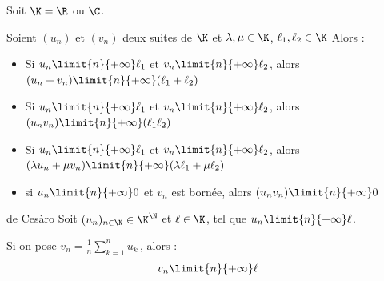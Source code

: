 \begin{theoreme}{}{}
    Soit $\K = \R$ ou $\C$. 

    Soient $(u_n)$ et $(v_n)$ deux suites de $\K$ et $\lambda, \mu \in \K$, $\ell_1, \ell_2 \in \K$ Alors : 

    \begin{itemize}
        \item Si $u_n \limit{n}{+\infty} \ell_1$ et $v_n \limit{n}{+\infty} \ell_2$, alors $(u_n + v_n) \limit{n}{+\infty} (\ell_1 + \ell_2)$
        \item Si $u_n \limit{n}{+\infty} \ell_1$ et $v_n \limit{n}{+\infty} \ell_2$, alors $(u_n v_n) \limit{n}{+\infty} (\ell_1 \ell_2)$
        \item Si $u_n \limit{n}{+\infty} \ell_1$ et $v_n \limit{n}{+\infty} \ell_2$, alors $(\lambda u_n + \mu v_n) \limit{n}{+\infty} (\lambda \ell_1 + \mu \ell_2)$
        \item si $u_n \limit{n}{+\infty} 0$ et $v_n$ est bornée, alors $(u_n v_n) \limit{n}{+\infty} 0$
    \end{itemize}
\end{theoreme}

\begin{theoreme}{de Cesàro}{}
    Soit $(u_n)_{n \in \N} \in \K^{\N}$ et $\ell \in \K$, tel que $u_n \limit{n}{+\infty} \ell$.
    
    Si on pose $\displaystyle v_n = \frac 1 n \sum_{k=1}^n u_k$\,, alors :
    $$v_n \limit{n}{+\infty} \ell$$
\end{theoreme}


